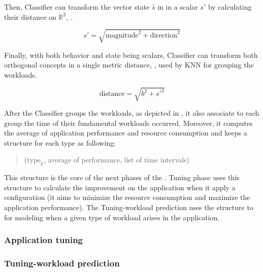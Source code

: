 Then, Classifier can transform the vector state $\hat{s}$ in in a scalar $s'$ by
calculating their distance on $\mathbb{R}^2$, .

\begin{equation}
  s' = \sqrt{\text{magnitude}^2 + \text{direction}^2}
  \label{eq:distance1}
\end{equation}

Finally, with both behavior and state being scalars, Classifier can transform
both orthogonal concepts in a single metric $\text{distance}$,
, used by KNN for grouping the workloads.

\begin{equation}
  \text{distance} = \sqrt{b^2 + s'^2}
  \label{eq:distance2}
\end{equation}

After the Classifier groups the workloads, as depicted in
, it also associate to each group the time of
their fundamental workloads occurred. Moreover, it computes the average of application
performance and resource consumption and keeps a structure for each type as following:

\begin{quote}
  \centering
  ($\text{type}_k$, average of performance, list of time intervals)
\end{quote}

This structure is the core of the next phases of the \name. Tuning phase uses
this structure to calculate the improvement on the application when it apply a
configuration (it aims to minimize the resource consumption and maximize the
application performance). The Tuning-workload prediction uses the structure to
for modeling when a given type of workload arises in the application.

\subsubsection{Application tuning}


\subsubsection{Tuning-workload prediction}

